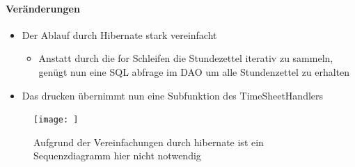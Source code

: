 \paragraph{Veränderungen}
\begin{itemize}
    \item Der Ablauf durch Hibernate stark vereinfacht
    \begin{itemize}
        \item Anstatt durch die for Schleifen die Stundezettel iterativ zu sammeln, genügt nun eine SQL abfrage im DAO um alle Stundenzettel zu erhalten
    \end{itemize}
    \item Das drucken übernimmt nun eine Subfunktion des TimeSheetHandlers
\end{itemize}

\begin{figure}
  \centering
    \texttt{[image: ]}
   \caption{Aufgrund der Vereinfachungen durch hibernate ist ein Sequenzdiagramm hier nicht notwendig}
\end{figure}